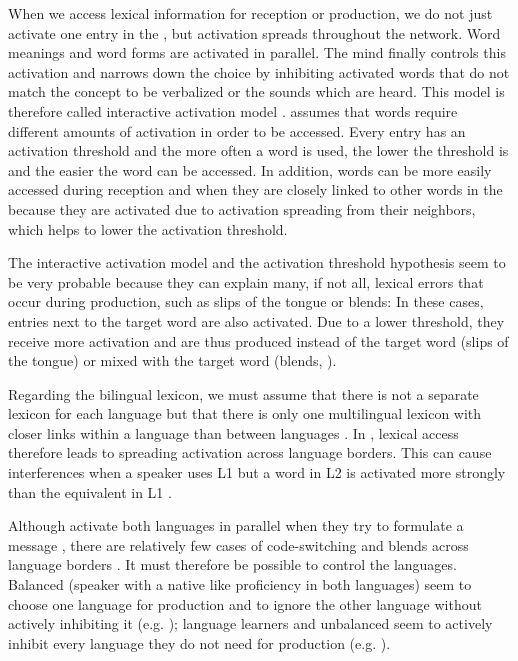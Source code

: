 \documentclass[output=paper]{LSP/langsci}
\begin{document}
When we access lexical information for reception or production, we do not just activate one entry in the , but activation spreads throughout the network. Word meanings and word forms are activated in parallel. The mind finally controls this activation and narrows down the choice by inhibiting activated words that do not match the concept to be verbalized or the sounds which are heard. This model is therefore called interactive activation model \citep{Dell1986}. \citet{Paradis2004} assumes that words require different amounts of activation in order to be accessed. Every entry has an activation threshold and the more often a word is used, the lower the threshold is and the easier the word can be accessed. In addition, words can be more easily accessed during reception and when they are closely linked to other words in the  because they are activated due to activation spreading from their neighbors, which helps to lower the activation threshold. 

The interactive activation model and the activation threshold hypothesis seem to be very probable because they can explain many, if not all, lexical errors that occur during production, such as slips of the tongue or blends: In these cases, entries next to the target word are also activated. Due to a lower threshold, they receive more activation and are thus produced instead of the target word (slips of the tongue) or mixed with the target word (blends, \citealt{Aitchison2012}). 

Regarding the bilingual lexicon, we must assume that there is not a separate lexicon for each language but that there is only one multilingual lexicon with closer links within a language than between languages \citep{Paradis2004}. In , lexical access therefore leads to spreading activation across language borders. This can cause interferences when a speaker uses L1 but a word in L2 is activated more strongly than the equivalent in L1 \citep{Plieger2006}. 

Although  activate both languages in parallel when they try to formulate a message \citep{Christoffels2007}, there are relatively few cases of code-switching and blends across language borders \citep{DeGroot2011}. It must therefore be possible to control the languages. Balanced  (speaker with a native like proficiency in both languages) seem to choose one language for production and to ignore the other language without actively inhibiting it (e.g. \citealt{Costa1999, Costa2005}); language learners and unbalanced  seem to actively inhibit every language they do not need for production (e.g. \citealt{Costa2005, Paradis2004}).
\end{document}
